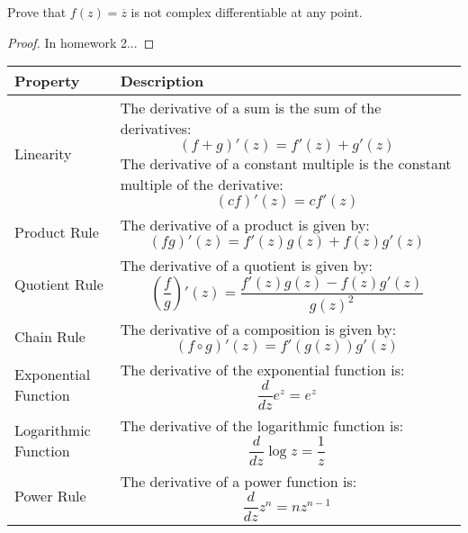 \begin{example}
    Prove that $f(z) = \overline{z}$ is not complex differentiable at any point.
\end{example}
\begin{proof}
    In homework 2...
\end{proof}

\begin{table}[htbp]
    \centering
    \begin{tabular}{| m{5cm} | m{9cm} |}
        \hline
        \textbf{Property}       & \textbf{Description}                                                                                                                                                                               \\
        \hline
        Linearity               & The derivative of a sum is the sum of the derivatives: \[ (f + g)'(z) = f'(z) + g'(z) \] The derivative of a constant multiple is the constant multiple of the derivative: \[ (cf)'(z) = cf'(z) \] \\
        \hline
        Product Rule            & The derivative of a product is given by: \[ (fg)'(z) = f'(z)g(z) + f(z)g'(z) \]                                                                                                                    \\
        \hline
        Quotient Rule           & The derivative of a quotient is given by: \[ \left( \frac{f}{g} \right)'(z) = \frac{f'(z)g(z) - f(z)g'(z)}{g(z)^2} \]                                                                              \\
        \hline
        Chain Rule              & The derivative of a composition is given by: \[ (f \circ g)'(z) = f'(g(z))g'(z) \]                                                                                                                 \\
        \hline
        Exponential Function    & The derivative of the exponential function is: \[ \frac{d}{dz} e^z = e^z \]                                                                                                                        \\
        \hline
        Logarithmic Function    & The derivative of the logarithmic function is: \[ \frac{d}{dz} \log z = \frac{1}{z} \]                                                                                                             \\
        \hline
        Power Rule              & The derivative of a power function is: \[ \frac{d}{dz} z^n = nz^{n-1} \]                                                                                                                           \\

\end{tabular}
\end{table}
